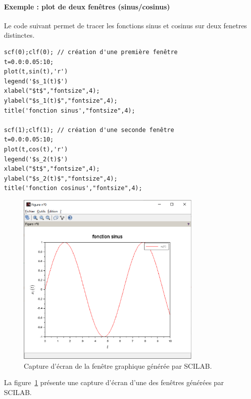 \paragraph{Exemple : plot de deux fenêtres (sinus/cosinus)}
Le code suivant permet de tracer les fonctions sinus et cosinus sur deux fenetres
distinctes. 

\begin{code}
\begin{verbatim}
scf(0);clf(0); // création d'une première fenêtre
t=0.0:0.05:10; 
plot(t,sin(t),'r')
legend('$s_1(t)$')
xlabel("$t$","fontsize",4);
ylabel("$s_1(t)$","fontsize",4);
title('fonction sinus',"fontsize",4);

scf(1);clf(1); // création d'une seconde fenêtre    
t=0.0:0.05:10;
plot(t,cos(t),'r')
legend('$s_2(t)$')
xlabel("$t$","fontsize",4);
ylabel("$s_2(t)$","fontsize",4);
title('fonction cosinus',"fontsize",4);  
\end{verbatim}
\end{code}

\begin{figure}[!ht]
    \centering
    \includegraphics[width=0.8\textwidth]{fig/capture_SCILAB.eps}
    \caption{Capture d'écran de la fenêtre graphique générée par SCILAB.\label{fig-capture-SCILAB}}
\end{figure}

La figure~\cref{fig-capture-SCILAB} présente une capture d'écran 
d'une des fenêtres générées par SCILAB.
          
